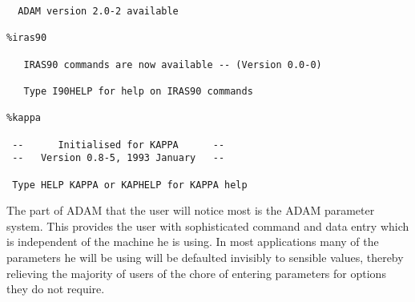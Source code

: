 \begin{itemize}
\begin{small}
\begin{verbatim}
  ADAM version 2.0-2 available

%iras90
 
   IRAS90 commands are now available -- (Version 0.0-0)
 
   Type I90HELP for help on IRAS90 commands

%kappa
 
 --      Initialised for KAPPA      -- 
 --   Version 0.8-5, 1993 January   -- 
 
 Type HELP KAPPA or KAPHELP for KAPPA help   
\end{verbatim}
\end{small}
\end{itemize}

The part of ADAM that the user will notice most is the ADAM parameter system.
This provides the user with sophisticated command and data entry which is 
independent of the machine he is using. In most applications many of the
parameters he will be using will be defaulted invisibly to sensible values,
thereby relieving the majority of users of the chore of entering parameters for
options they do not require.
